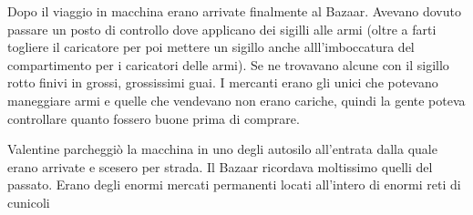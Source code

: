     Dopo il viaggio in macchina erano arrivate finalmente al Bazaar. Avevano dovuto passare un posto di controllo dove
    applicano dei sigilli alle armi (oltre a farti togliere il caricatore per poi mettere un sigillo anche
    alll'imboccatura del compartimento per i caricatori delle armi). Se ne trovavano alcune con il sigillo rotto finivi in grossi, grossissimi guai. I
    mercanti erano gli unici che potevano maneggiare armi e quelle che vendevano non erano cariche, quindi la gente
    poteva controllare quanto fossero buone prima di comprare. 

    Valentine parcheggiò la macchina in uno degli autosilo all'entrata dalla quale erano arrivate e scesero per strada.
    Il Bazaar ricordava moltissimo quelli del passato. Erano degli enormi mercati permanenti locati all'intero di enormi
    reti di cunicoli
